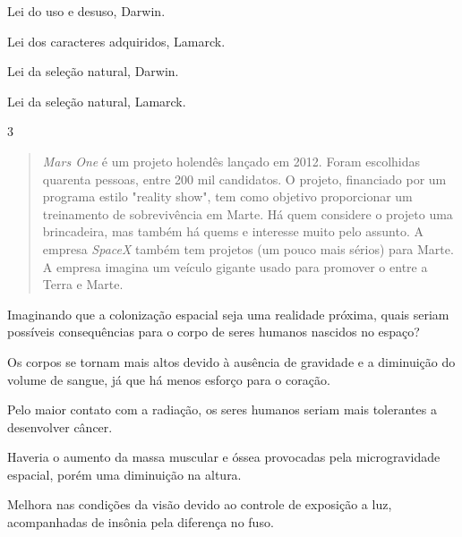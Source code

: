 \begin{escolha}
\item
  Lei do uso e desuso, Darwin.
\item
  Lei dos caracteres adquiridos, Lamarck.
\item
  Lei da seleção natural, Darwin.
\item
  Lei da seleção natural, Lamarck.
\end{escolha}


\num{3}
  \begin{quote}
 \emph{Mars One} é um projeto holendês lançado em 2012. Foram
  escolhidas quarenta pessoas, entre 200 mil candidatos. O projeto, 
  financiado por um programa estilo "reality show", tem como objetivo proporcionar um treinamento de sobrevivência em Marte. Há quem considere o projeto uma brincadeira, mas também há quems e interesse muito pelo assunto. A empresa \emph{SpaceX} também tem projetos (um pouco mais sérios)
  para Marte. A empresa
  imagina um veículo gigante usado para promover o  entre a Terra e Marte.

\end{quote}

Imaginando que a colonização espacial seja uma realidade próxima, quais seriam
possíveis consequências para o corpo de seres humanos nascidos no espaço?

\begin{escolha}
\item
  Os corpos se tornam mais altos devido à ausência de gravidade e a
  diminuição do volume de sangue, já que há menos esforço para o coração.
\item
  Pelo maior contato com a radiação, os seres humanos seriam mais
  tolerantes a desenvolver câncer.
\item
  Haveria o aumento da massa muscular e óssea provocadas pela
  microgravidade espacial, porém uma diminuição na altura.
\item
  Melhora nas condições da visão devido ao controle de exposição a luz,
  acompanhadas de insônia pela diferença no fuso.
\end{escolha}

